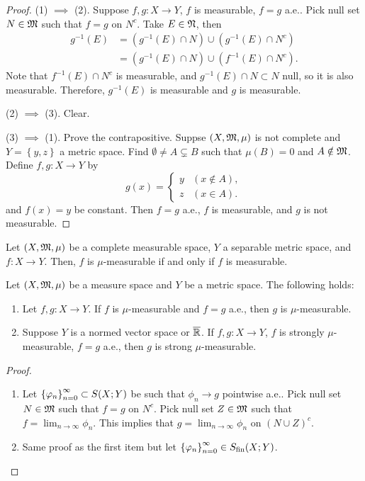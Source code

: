 \documentclass[a4paper]{article}
\begin{document}
\begin{proof}
  
(1) $\implies$ (2). Suppose $f, g: X \to Y$, $f$ is measurable, 
$f = g$ a.e.. Pick null set $N \in \mathfrak{M}$ such that 
$f = g$ on $N^c$. Take $E \in \mathfrak{N}$, then 
\[
\begin{aligned}
  g^{-1}(E) 
  &= (g^{-1}(E) \cap N) \cup (g^{-1} (E) \cap N^c) \\
  &= (g^{-1}(E) \cap N) \cup (f^{-1} (E) \cap N^c).
\end{aligned}
\]
Note that $f^{-1}(E) \cap N^c$ is measurable, 
and $g^{-1}(E) \cap N \subset N$ null, so it is also measurable.
Therefore, $g^{-1}(E)$ is measurable and $g$ is measurable.

(2) $\implies$ (3). Clear. 

(3) $\implies$ (1). Prove the contrapositive. 
Suppse $(X, \mathfrak{M}, \mu)$ is not complete and 
$Y = \left\{ y, z \right\}$ a metric space. 
Find $\emptyset \neq A \subsetneq B$ such that 
$\mu(B) = 0$ and $A \notin \mathfrak{M}$. Define $f, g : 
X \to Y$ by 
\[
g(x) = \begin{cases}
  y & (x \notin A), \\
  z & (x \in A).
\end{cases}
\]
and $f(x) = y$ be constant. Then $f = g$ a.e., 
$f$ is measurable, and $g$ is not measurable. 
\end{proof}

\begin{cor}
  Let $(X, \mathfrak{M}, \mu)$ be a complete measurable space,
  $Y$ a separable metric space, and $f: X \to Y$. 
  Then, $f$ is $\mu$-measurable if and only if 
  $f$ is measurable.
\end{cor}

\begin{prop}
  Let $(X, \mathfrak{M}, \mu)$ be a measure space and $Y$ be a metric 
  space. The following holds: 
  \begin{enumerate}
    \item Let $f, g: X \to Y$. If $f$ is $\mu$-measurable
    and $f = g$ a.e., then $g$ is $\mu$-measurable.

    \item Suppose $Y$ is a normed vector space or 
    $\overline{\mathbb{R}}$. If $f, g: X \to Y$, $f$ is strongly 
    $\mu$-measurable, $f = g$ a.e., then 
    $g$ is strong $\mu$-measurable.
  \end{enumerate}
\end{prop}

\begin{proof}
  \begin{enumerate}
    \item Let $\left\{ \varphi_n \right\}_{n=0}^\infty \subset S(X; Y)$ be such that 
    $\phi_n \to g$ pointwise a.e.. Pick null set 
    $N \in \mathfrak{M}$ such that $f = g$ on $N^c$. Pick 
    null set $Z \in \mathfrak{M}$ such that $f = \lim_{n \to \infty}
    \phi_n$. This implies that 
    $g = \lim_{n \to \infty} \phi_n$ on $(N \cup Z)^c$. 

    \item Same proof as the first item but let 
    $\left\{ \varphi_n \right\}_{n=0}^\infty \in S_{\text{fin}}(X; Y)$.
  \end{enumerate}
\end{proof}
\end{document}
